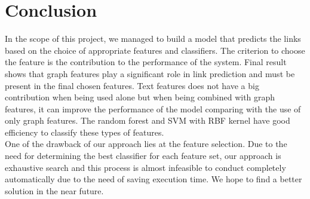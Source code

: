 \documentclass{article}
\begin{document}
\section{Conclusion}
\label{sec:conclusion}
In the scope of this project, we managed to build a model that predicts the links based on the choice of appropriate features and classifiers. The criterion to choose the feature is the contribution to the performance of the system. Final result shows that graph features play a significant role in link prediction and must be present in the final chosen features. Text features does not have a big contribution when being used alone but when being combined with graph features, it can improve the performance of the model comparing with the use of only graph features. The random forest and SVM with RBF kernel have good efficiency to classify these types of features.\\
One of the drawback of our approach lies at the feature selection. Due to the need for determining the best classifier for each feature set, our approach is exhaustive search and this process is almost infeasible to conduct completely automatically due to the need of saving execution time. We hope to find a better solution in the near future.



\end{document}
